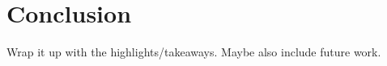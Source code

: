 
\section{Conclusion}
\label{sec:conclusion}

Wrap it up with the highlights/takeaways.  Maybe also include future work.